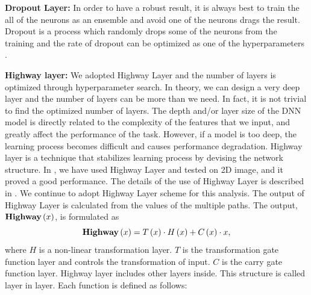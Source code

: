 \documentclass[useamsfonts]{pasj01}
\begin{document}
{\bf Dropout Layer:}
In order to have a robust result, it is always best to train the all of the neurons as an ensemble and avoid one of the neurons drags the result.  Dropout is a process which randomly drops some of the neurons from the training and the rate of dropout can be optimized as one of the hyperparameters \citep{dropout}. 

{\bf Highway layer:}
We adopted Highway Layer \citep{srivastava15a} and the number of layers is optimized through hyperparameter search.   In theory, we can design a very deep layer and the number of layers can be more than we need.   In fact, it is not trivial to find the optimized number of layers.   
The depth and/or layer size of the DNN model is directly related to the complexity of the features that we input, and greatly affect the performance of the task.  
However, if a model is too deep, the learning process becomes difficult and causes performance degradation.
Highway layer is a technique that stabilizes learning process by devising the network structure.
In \citet{kimura17a}, we have used Highway Layer and tested on 2D image, and it proved a good performance.  The details of the use of Highway Layer is described in \citet{kimura17a}.  We continue to adopt Highway Layer scheme for this analysis.
The output of Highway Layer is calculated from the values of the multiple paths.
The output, ${\bf Highway} \left(x\right)$, is formulated as
\begin{equation}
    {\bf Highway} \left(x\right) = T \left(x\right) \cdot H \left(x\right) + C \left(x\right) \cdot x,
\end{equation}
where $H$ is a non-linear transformation layer. $T$ is the transformation gate function layer and controls the transformation of input.  $C$ is the carry gate function layer.
Highway layer includes other layers inside.  This structure is called layer in layer.  Each function is defined as follows: 
\end{document}

